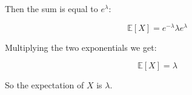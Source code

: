 \singlespacing

\break

Then the sum is equal to $e^{\lambda}$:

\singlespacing

\begin{equation}
    \mathbb{E}[X] = e^{-\lambda} \lambda e^{\lambda}
\end{equation}

\singlespacing

Multiplying the two exponentials we get:

\singlespacing

\begin{equation}
    \mathbb{E}[X] = \lambda
\end{equation}

\singlespacing

So the expectation of $X$ is $\lambda$.